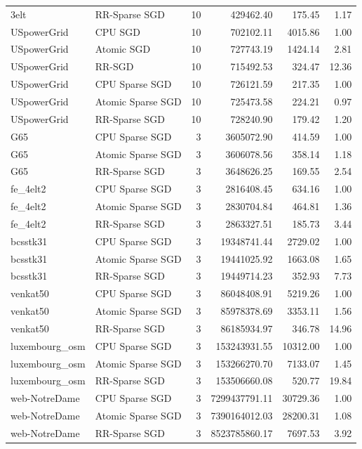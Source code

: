 \begin{tabular}{llrrrr}
3elt & RR-Sparse SGD & 10 & 429462.40 & 175.45 & 1.17 \\
USpowerGrid & CPU SGD & 10 & 702102.11 & 4015.86 & 1.00 \\
USpowerGrid & Atomic SGD & 10 & 727743.19 & 1424.14 & 2.81 \\
USpowerGrid & RR-SGD & 10 & 715492.53 & 324.47 & 12.36 \\
USpowerGrid & CPU Sparse SGD & 10 & 726121.59 & 217.35 & 1.00 \\
USpowerGrid & Atomic Sparse SGD & 10 & 725473.58 & 224.21 & 0.97 \\
USpowerGrid & RR-Sparse SGD & 10 & 728240.90 & 179.42 & 1.20 \\
G65 & CPU Sparse SGD & 3 & 3605072.90 & 414.59 & 1.00 \\
G65 & Atomic Sparse SGD & 3 & 3606078.56 & 358.14 & 1.18 \\
G65 & RR-Sparse SGD & 3 & 3648626.25 & 169.55 & 2.54 \\
fe\_4elt2 & CPU Sparse SGD & 3 & 2816408.45 & 634.16 & 1.00 \\
fe\_4elt2 & Atomic Sparse SGD & 3 & 2830704.84 & 464.81 & 1.36 \\
fe\_4elt2 & RR-Sparse SGD & 3 & 2863327.51 & 185.73 & 3.44 \\
bcsstk31 & CPU Sparse SGD & 3 & 19348741.44 & 2729.02 & 1.00 \\
bcsstk31 & Atomic Sparse SGD & 3 & 19441025.92 & 1663.08 & 1.65 \\
bcsstk31 & RR-Sparse SGD & 3 & 19449714.23 & 352.93 & 7.73 \\
venkat50 & CPU Sparse SGD & 3 & 86048408.91 & 5219.26 & 1.00 \\
venkat50 & Atomic Sparse SGD & 3 & 85978378.69 & 3353.11 & 1.56 \\
venkat50 & RR-Sparse SGD & 3 & 86185934.97 & 346.78 & 14.96 \\
luxembourg\_osm & CPU Sparse SGD & 3 & 153243931.55 & 10312.00 & 1.00 \\
luxembourg\_osm & Atomic Sparse SGD & 3 & 153266270.70 & 7133.07 & 1.45 \\
luxembourg\_osm & RR-Sparse SGD & 3 & 153506660.08 & 520.77 & 19.84 \\
web-NotreDame & CPU Sparse SGD & 3 & 7299437791.11 & 30729.36 & 1.00 \\
web-NotreDame & Atomic Sparse SGD & 3 & 7390164012.03 & 28200.31 & 1.08 \\
web-NotreDame & RR-Sparse SGD & 3 & 8523785860.17 & 7697.53 & 3.92 \\
\hline
\end{tabular}

